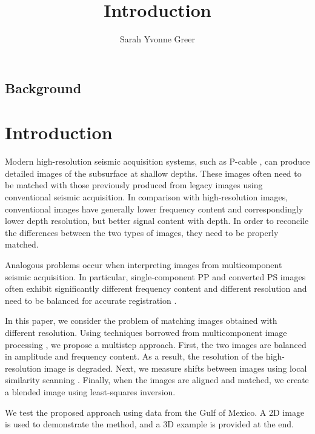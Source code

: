 \title{Introduction}
\author{Sarah Yvonne Greer}
\maketitle

\subsection{Background}


\section{Introduction}

Modern high-resolution seismic acquisition systems, such as P-cable
\cite[]{pcable,tip}, can produce detailed images of the subsurface at
shallow depths. These images often need to be matched with those
previously produced from legacy images using conventional seismic acquisition. In
comparison with high-resolution images, conventional images have
generally lower frequency content and correspondingly lower depth
resolution, but better signal content with depth. In order to reconcile the
differences between the two types of images, they need to be
properly matched.

Analogous problems occur when interpreting images from multicomponent
seismic acquisition. In particular, single-component
PP and converted PS images often exhibit significantly different frequency content
and different resolution and need to be balanced for accurate registration
\cite[]{hardage,SEG-2003-07810784,warp}.

In this paper, we consider the problem of matching images obtained
with different resolution. Using techniques borrowed from
multicomponent image processing \cite[]{warp}, we propose a multistep
approach. First, the two images are balanced in amplitude and
frequency content. As a result, the resolution of the
high-resolution image is degraded. Next, we measure shifts between
images using local similarity
scanning \cite[]{attr,timelapse}. Finally, when the images are aligned and 
matched, we create a blended image using least-squares inversion.

We test the proposed approach using data from the Gulf of Mexico. 
A 2D image is used to demonstrate the method, and a 3D
example is provided at the end.



